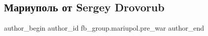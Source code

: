  
 
 
 
 

\subsection{Мариуполь от Sergey Drovorub}
\label{sec:09_02_2023.fb.fb_group.mariupol.pre_war.1.mariupol_ot_sergey_d}

\ifcmt
 author_begin
   author_id fb_group.mariupol.pre_war
 author_end
\fi
